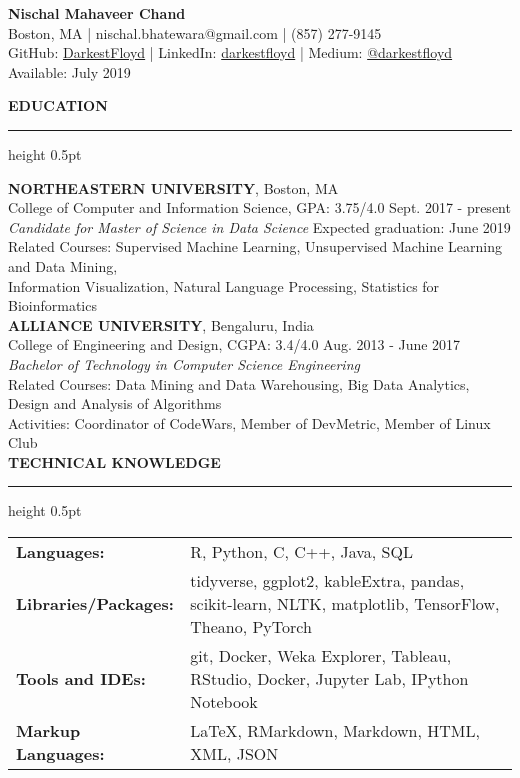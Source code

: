 \documentclass[a4paper]{article}
\newcommand{\myline}{\par
  \kern2pt %
  \hrule height 0.5pt
  \kern2pt %
}
\begin{document}
	\begin{center}
		{\Large \textbf{Nischal Mahaveer Chand}} \\
		Boston, MA | nischal.bhatewara@gmail.com | (857) 277-9145 \\
                GitHub: \href{https://github.com/DarkestFloyd}{DarkestFloyd} | 
                LinkedIn: \href{https://www.linkedin.com/in/darkestfloyd}{darkestfloyd} |
		Medium: \href{https://medium.com/@darkestfloyd}{@darkestfloyd} \\
		Available: July 2019 \\
	\end{center}
	
	\noindent
	{\large \textbf{EDUCATION}}
	\myline 
	\smallskip
	
	\noindent
	\textbf{NORTHEASTERN UNIVERSITY}, Boston, MA \\
	College of Computer and Information Science, GPA: 3.75/4.0 
        \hfill Sept. 2017 - present \\
	\textit{Candidate for Master of Science in Data Science} 
        \hfill Expected graduation: June 2019 \\
        Related Courses: Supervised Machine Learning, 
        Unsupervised Machine Learning and Data Mining, \\
        \hspace*{23.9mm} Information Visualization,
        Natural Language Processing, 
        Statistics for Bioinformatics \\
	
	\noindent
	\textbf{ALLIANCE UNIVERSITY}, Bengaluru, India \\
	College of Engineering and Design, CGPA: 3.4/4.0 \hfill Aug. 2013 - June 2017 \\
	\textit{Bachelor of Technology in Computer Science Engineering} \\
	Related Courses: 
                                    Data Mining and Data Warehousing,
                                    Big Data Analytics, 
                                    Design and Analysis of Algorithms \\
	Activities: Coordinator of CodeWars, Member of DevMetric, Member of Linux 
        Club \\
	
	\noindent
	{\large \textbf{TECHNICAL KNOWLEDGE}}
	\myline 
	
	\noindent
	\begin{tabular}{ m{3.5cm} l }
		\textbf{Languages: } & R, Python, C, C++, Java, SQL \\ 
		\textbf{Libraries/Packages: } & tidyverse, ggplot2, kableExtra, pandas, scikit-learn, NLTK, 
                 matplotlib, TensorFlow, Theano, PyTorch \\
		\textbf{Tools and IDEs: } & git, Docker, Weka Explorer, Tableau, RStudio, Docker,
                Jupyter Lab, IPython Notebook\\
		\textbf{Markup Languages: } & LaTeX, RMarkdown, Markdown, HTML, XML, JSON \\
	\end{tabular} \\
\end{document}
